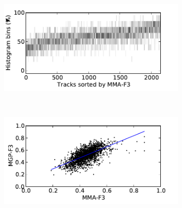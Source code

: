 \documentclass{article}
\begin{document}
\begin{figure}
      \begin{subfigure}[b]{0.25\textwidth}
              \includegraphics[width=\textwidth]{plots/histo-F3.pdf}
              \caption{}
              \label{fig:histo-F3}
      \end{subfigure}%
      ~ 
      \begin{subfigure}[b]{0.25\textwidth}
              \includegraphics[width=\textwidth]{plots/correl-F3.pdf}
              \caption{}
              \label{fig:correl-F3}
      \end{subfigure}


\end{figure}
\end{document}
